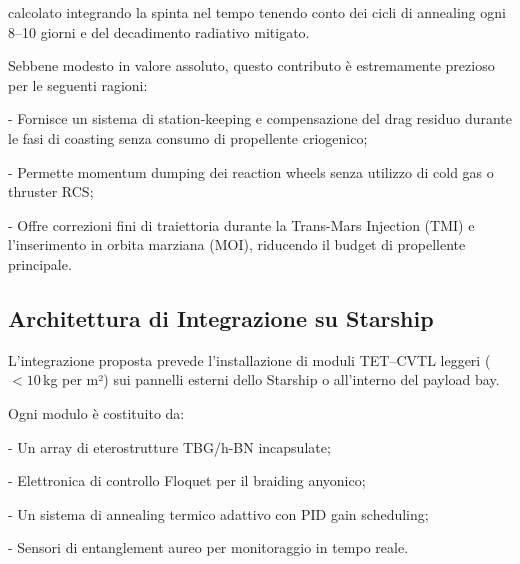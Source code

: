 \documentclass[11pt,a4paper]{article}
\theoremstyle{plain}
\theoremstyle{definition}
\begin{document}
\vspace{0.2cm}
calcolato integrando la spinta nel tempo tenendo conto dei cicli di annealing ogni 8–10 giorni e del decadimento radiativo mitigato.

\vspace{0.2cm}

Sebbene modesto in valore assoluto, questo contributo è estremamente prezioso per le seguenti ragioni:

\vspace{0.2cm}
- Fornisce un sistema di station-keeping e compensazione del drag residuo durante le fasi di coasting senza consumo di propellente criogenico;


\vspace{0.2cm}
- Permette momentum dumping dei reaction wheels senza utilizzo di cold gas o thruster RCS;


\vspace{0.2cm}
- Offre correzioni fini di traiettoria durante la Trans-Mars Injection (TMI) e l’inserimento in orbita marziana (MOI), riducendo il budget di propellente principale.



\vspace{0.7cm}



\subsection{Architettura di Integrazione su Starship}

\vspace{0.4cm}



L’integrazione proposta prevede l’installazione di moduli TET--CVTL leggeri ($<10$\,kg per m²) sui pannelli esterni dello Starship o all’interno del payload bay. 

\vspace{0.3cm}

Ogni modulo è costituito da:

\vspace{0.3cm}
- Un array di eterostrutture TBG/h-BN incapsulate;

\vspace{0.3cm}
- Elettronica di controllo Floquet per il braiding anyonico;

\vspace{0.3cm}
- Un sistema di annealing termico adattivo con PID gain scheduling;

\vspace{0.3cm}
- Sensori di entanglement aureo per monitoraggio in tempo reale.
\end{document}
